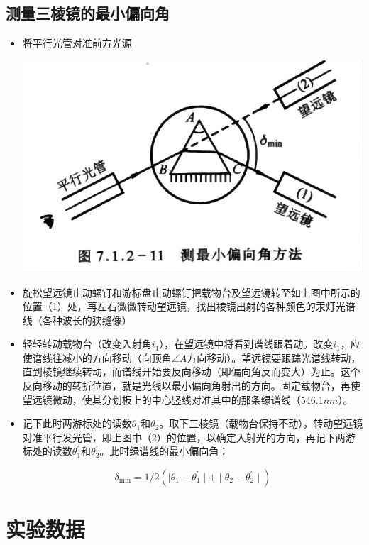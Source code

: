 \documentclass[a4paper]{ltxdoc}
\newenvironment{Figure}
{\par\medskip\noindent\minipage{\linewidth}}
{\endminipage\par\medskip}
\begin{document}
\begin{multicols}{2}
    \subsection{测量三棱镜的最小偏向角}
    \begin{itemize}
        \item 将平行光管对准前方光源
              \begin{Figure}
                  \centering
                  \includegraphics[width=\linewidth]{img/2.png}
              \end{Figure}
        \item 旋松望远镜止动螺钉和游标盘止动螺钉把载物台及望远镜转至如上图中所示的位置（1）处，再左右微微转动望远镜，找出棱镜出射的各种颜色的汞灯光谱线（各种波长的狭缝像）
        \item 轻轻转动载物台（改变入射角$i_1$），在望远镜中将看到谱线跟着动。改变$i_1$，应使谱线往减小的方向移动（向顶角$\angle A$方向移动）。望远镜要跟踪光谱线转动，直到棱镜继续转动，而谱线开始要反向移动（即偏向角反而变大）为止。这个反向移动的转折位置，就是光线以最小偏向角射出的方向。固定载物台，再使望远镜微动，使其分划板上的中心竖线对准其中的那条绿谱线（$546.1 nm$）。
        \item 记下此时两游标处的读数$\theta_1$和$\theta_2$。取下三棱镜（载物台保持不动），转动望远镜对准平行发光管，即上图中（2）的位置，以确定入射光的方向，再记下两游标处的读数$\theta_1^{\prime}$和$\theta_2^{\prime}$。此时绿谱线的最小偏向角：

              $$
                  \delta_{\min} = 1/2 (\mid \theta_1 - \theta_1^{\prime}\mid + \mid \theta_2 - \theta_2^{\prime}\mid)
              $$
    \end{itemize}

    \section{实验数据}


\end{multicols}
\end{document}
